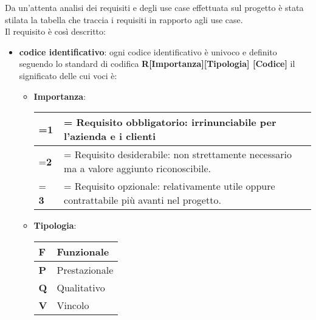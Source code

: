 Da un'attenta analisi dei requisiti e degli use case effettuata sul progetto è stata stilata la tabella che traccia i requisiti in rapporto agli use case.\\
Il requisito è così descritto:
    \begin{itemize}
    \setlength\itemsep{1em}

        \item \textbf{codice identificativo}: ogni codice 				identificativo è univoco e definito seguendo lo 					standard di codifica \textbf{R[Importanza][Tipologia]				[Codice]}  il significato delle cui voci è:
        \begin{itemize}
        \setlength\itemsep{1em}

            \item \textbf{Importanza}:
            \begin{center}
                
                \renewcommand{\arraystretch}{1.8}
                \renewcommand\tabularxcolumn[1]{m{#1}}
                \begin{tabularx}{0.85\textwidth} {
                    >{\hsize=0.1\hsize\linewidth=\hsize}X
                    >{\hsize=1.9\hsize\linewidth=\hsize}X
                }
                    \hline
                    \textbf{1} & Requisito obbligatorio: 								irrinunciabile per l'azienda e i clienti \\
                    \hline
                    \textbf{2} & Requisito desiderabile: non 							strettamente necessario ma  a valore 							aggiunto riconoscibile. \\
                    \hline
                    \textbf{3} &  Requisito opzionale: 								relativamente utile oppure contrattabile 							più avanti nel progetto. \\
                    \hline
                \end{tabularx}
                \smallskip
            \end{center}
			
            \item \textbf{Tipologia}:
            \begin{center}
                
                \renewcommand{\arraystretch}{1.5}
                \begin{tabular}{m{2em} m{10em}}
                    \hline
                    \textbf{F} & Funzionale \\
                    \hline
                    \textbf{P} & Prestazionale \\
                    \hline
                    \textbf{Q} & Qualitativo \\
                    \hline
                    \textbf{V} &  Vincolo \\
                    \hline
                \end{tabular}
                \smallskip
            \end{center}
            

\end{itemize}
\end{itemize}
